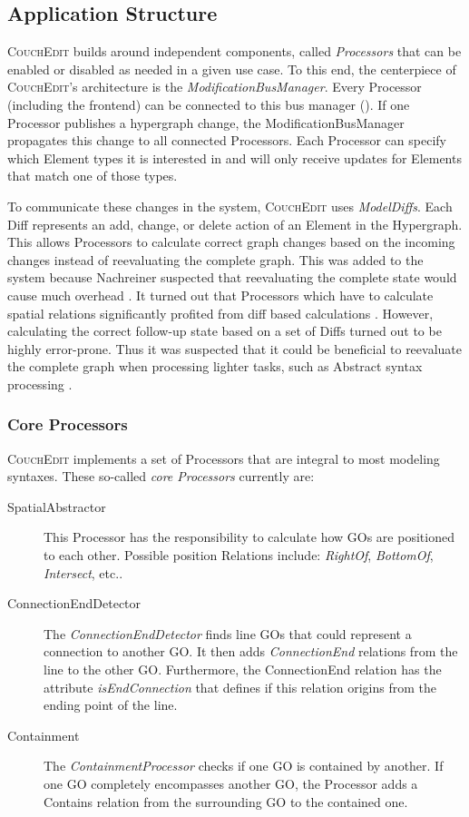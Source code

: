 \subsection{Application Structure}
\textsc{CouchEdit} builds around independent components, called \emph{Processors} that can be enabled or disabled as needed in a given use case. To this end, the centerpiece of \textsc{CouchEdit}'s architecture is the \emph{ModificationBusManager}. Every Processor (including the frontend) can be connected to this bus manager (). If one Processor publishes a hypergraph change, the ModificationBusManager propagates this change to all connected Processors. Each Processor can specify which Element types it is interested in and will only receive updates for Elements that match one of those types. 

To communicate these changes in the system, \textsc{CouchEdit} uses \emph{ModelDiffs}. Each Diff represents an add, change, or delete action of an Element in the Hypergraph. This allows Processors to calculate correct graph changes based on the incoming changes instead of reevaluating the complete graph. This was added to the system because Nachreiner suspected that reevaluating the complete state would cause much overhead \cite{nachreiner_couchedit_2020}. It turned out that Processors which have to calculate spatial relations significantly profited from diff based calculations  \cite{nachreiner_couchedit_2020}. However, calculating the correct follow-up state based on a set of Diffs turned out to be highly error-prone. Thus it was suspected that it could be beneficial to reevaluate the complete graph when processing lighter tasks, such as Abstract syntax processing \cite{nachreiner_couchedit_2020}.

\subsubsection{Core Processors}
\label{sec:core-processors}
\textsc{CouchEdit} implements a set of Processors that are integral to most modeling syntaxes. These so-called \emph{core Processors} currently are: 
\begin{description}
  \item[SpatialAbstractor] This Processor has the responsibility to calculate how GOs are positioned to each other. Possible position Relations include: \emph{RightOf}, \emph{BottomOf}, \emph{Intersect}, etc..
  \item[ConnectionEndDetector] The \emph{ConnectionEndDetector} finds line GOs that could represent a connection to another GO. It then adds \emph{ConnectionEnd} relations from the line to the other GO. Furthermore, the ConnectionEnd relation has the attribute \emph{isEndConnection} that defines if this relation origins from the ending point of the line.
  \item[Containment] The \emph{ContainmentProcessor} checks if one GO is contained by another. If one GO completely encompasses another GO, the Processor adds a Contains relation from the surrounding GO to the contained one.
\end{description}

